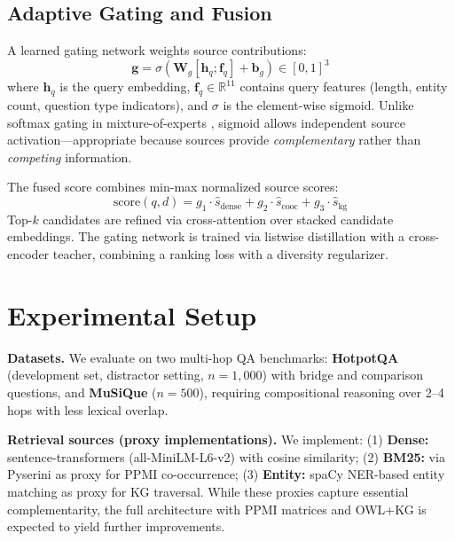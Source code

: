 \documentclass[preprint,12pt]{elsarticle}
\begin{document}
\subsection{Adaptive Gating and Fusion}

A learned gating network weights source contributions:
\begin{equation}
\mathbf{g} = \sigma(\mathbf{W}_g [\mathbf{h}_q; \mathbf{f}_q] + \mathbf{b}_g) \in [0,1]^3
\end{equation}
where $\mathbf{h}_q$ is the query embedding, $\mathbf{f}_q \in \mathbb{R}^{11}$ contains query features (length, entity count, question type indicators), and $\sigma$ is the element-wise sigmoid. Unlike softmax gating in mixture-of-experts \citep{shazeer2017outrageously}, sigmoid allows independent source activation---appropriate because sources provide \emph{complementary} rather than \emph{competing} information.

The fused score combines min-max normalized source scores:
\begin{equation}
\text{score}(q, d) = g_1 \cdot \hat{s}_{\text{dense}} + g_2 \cdot \hat{s}_{\text{cooc}} + g_3 \cdot \hat{s}_{\text{kg}}
\end{equation}
Top-$k$ candidates are refined via cross-attention \citep{vaswani2017attention} over stacked candidate embeddings. The gating network is trained via listwise distillation with a cross-encoder teacher, combining a ranking loss with a diversity regularizer.

\section{Experimental Setup}
\label{sec:experiments}

\textbf{Datasets.} We evaluate on two multi-hop QA benchmarks: \textbf{HotpotQA} \citep{yang2018hotpotqa} (development set, distractor setting, $n=1{,}000$) with bridge and comparison questions, and \textbf{MuSiQue} \citep{trivedi2022musique} ($n=500$), requiring compositional reasoning over 2--4 hops with less lexical overlap.

\textbf{Retrieval sources (proxy implementations).} We implement: (1) \textbf{Dense:} sentence-transformers (all-MiniLM-L6-v2) with cosine similarity; (2) \textbf{BM25:} via Pyserini \citep{robertson2009probabilistic} as proxy for PPMI co-occurrence; (3) \textbf{Entity:} spaCy NER-based entity matching as proxy for KG traversal. While these proxies capture essential complementarity, the full architecture with PPMI matrices and OWL+KG is expected to yield further improvements.
\end{document}
